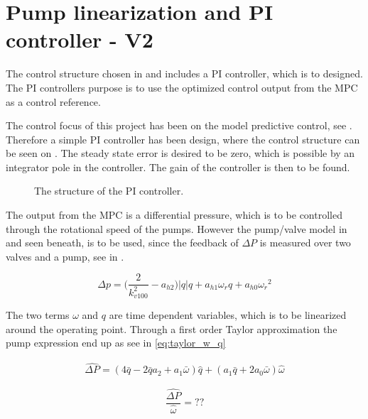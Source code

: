 \chapter{Pump linearization and PI controller - V2}
\label{cha:linear_pump2}

The control structure chosen in  and  includes a PI controller, which is to designed. The PI controllers purpose is to use the optimized control output from the MPC as a control reference. 

The control focus of this project has been on the model predictive control, see . Therefore a simple PI controller has been design, where the control structure can be seen on . The steady state error is desired to be zero, which is possible by an integrator pole in the controller. The gain of the controller is then to be found. 

\begin{figure}[H]
\centering
  
\caption{The structure of the PI controller.}
\label{fig:simple_PI}
\end{figure}

The output from the MPC is a differential pressure, which is to be controlled through the rotational speed of the pumps. However the pump/valve model in  and seen beneath, is to be used, since the feedback of $\Delta P$ is measured over two valves and a pump, see  in .

\begin{equation*}
 \Delta p = \Big(\frac{2}{k_{v100}^2} - a_{h2}\Big)|q| q  + a_{h1} \omega_r q + a_{h0}{\omega_r}^2
\end{equation*}

The two terms $\omega$ and $q$ are time dependent variables, which is to be linearized around the operating point. Through a first order Taylor approximation the pump expression end up as see in \eqref{eq:taylor_w_q}

\begin{equation}
	\begin{split}
	\hat{\Delta P} = (4\bar{q}-2\bar{q}a_2+a_1\bar{\omega})\hat{q} + (a_1\bar{q} + 2a_0\bar{\omega})\hat{\omega}
	\end{split}
	\label{eq:taylor_w_q}
\end{equation}


\begin{equation}
	\frac{\hat{\Delta P}}{\hat{\omega}} = ??
\end{equation}